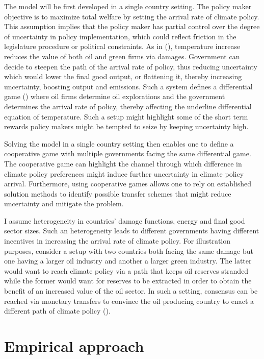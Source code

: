\documentclass[american]{scrartcl}
\newcommand{\citein}[1]{\citeauthor{#1} (\citeyear{#1})}
\begin{document}
The model will be first developed in a single country setting. The policy maker objective is to maximize total welfare by setting the arrival rate of climate policy. This assumption implies that the policy maker has partial control over the degree of uncertainty in policy implementation, which could reflect friction in the legislature procedure or political constraints. As in \citein{Barnett2019}, temperature increase reduces the value of both oil and green firms via damages. Government can decide to steepen the path of the arrival rate of policy, thus reducing uncertainty which would lower the final good output, or flattening it, thereby increasing uncertainty, boosting output and emissions. Such a system defines a differential game (\cite{Clemhout1979}) where oil firms determine oil explorations and the government determines the arrival rate of policy, thereby affecting the underline differential equation of temperature. Such a setup might highlight some of the short term rewards policy makers might be tempted to seize by keeping uncertainty high.

Solving the model in a single country setting then enables one to define a cooperative game with multiple governments facing the same differential game. The cooperative game can highlight the channel through which difference in climate policy preferences might induce further uncertainty in climate policy arrival. Furthermore, using cooperative games allows one to rely on established solution methods to identify possible transfer schemes that might reduce uncertainty and mitigate the problem.

I assume heterogeneity in countries' damage functions, energy and final good sector sizes. Such an heterogeneity leads to different governments having different incentives in increasing the arrival rate of climate policy. For illustration purposes, consider a setup with two countries both facing the same damage but one having a larger oil industry and another a larger green industry. The latter would want to reach climate policy via a path that keeps oil reserves stranded while the former would want for reserves to be extracted in order to obtain the benefit of an increased value of the oil sector. In such a setting, consensus can be reached via monetary transfers to convince the oil producing country to enact a different path of climate policy (\cite{Ju2006}).

\section{Empirical approach}
\end{document}
